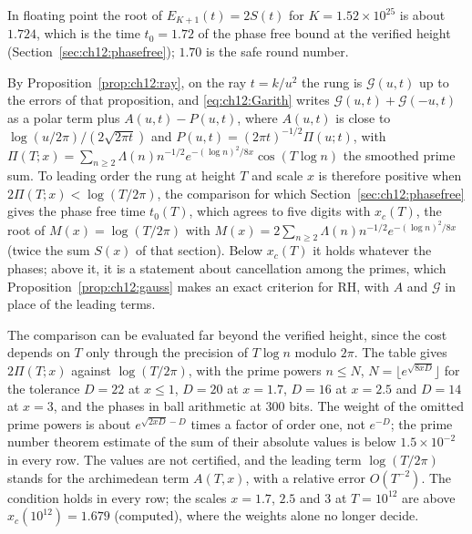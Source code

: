 In floating point the root of $E_{K+1}(t)=2S(t)$ for $K=1.52\times10^{25}$ is about $1.724$, which is the time $t_0=1.72$ of the phase free bound at the verified height (Section~\ref{sec:ch12:phasefree}); $1.70$ is the safe round number.

By Proposition~\ref{prop:ch12:ray}, on the ray $t=k/u^2$ the rung is $\mathcal G(u,t)$ up to the errors of that proposition, and \eqref{eq:ch12:Garith} writes $\mathcal G(u,t)+\mathcal G(-u,t)$ as a polar term plus $A(u,t)-P(u,t)$, where $A(u,t)$ is close to $\log(u/2\pi)/(2\sqrt{2\pi t})$ and $P(u,t)=(2\pi t)^{-1/2}\Pi(u;t)$, with $\Pi(T;x)=\sum_{n\ge2}\Lambda(n)n^{-1/2}e^{-(\log n)^2/8x}\cos(T\log n)$ the smoothed prime sum. To leading order the rung at height $T$ and scale $x$ is therefore positive when $2\Pi(T;x)<\log(T/2\pi)$, the comparison for which Section~\ref{sec:ch12:phasefree} gives the phase free time $t_0(T)$, which agrees to five digits with $x_c(T)$, the root of $M(x)=\log(T/2\pi)$ with $M(x)=2\sum_{n\ge2}\Lambda(n)n^{-1/2}e^{-(\log n)^2/8x}$ (twice the sum $S(x)$ of that section). Below $x_c(T)$ it holds whatever the phases; above it, it is a statement about cancellation among the primes, which Proposition~\ref{prop:ch12:gauss} makes an exact criterion for RH, with $A$ and $\mathcal G$ in place of the leading terms.

The comparison can be evaluated far beyond the verified height, since the cost depends on $T$ only through the precision of $T\log n$ modulo $2\pi$. The table gives $2\Pi(T;x)$ against $\log(T/2\pi)$, with the prime powers $n\le N$, $N=\lfloor e^{\sqrt{8xD}}\rfloor$ for the tolerance $D=22$ at $x\le1$, $D=20$ at $x=1.7$, $D=16$ at $x=2.5$ and $D=14$ at $x=3$, and the phases in ball arithmetic at $300$ bits. The weight of the omitted prime powers is about $e^{\sqrt{2xD}-D}$ times a factor of order one, not $e^{-D}$; the prime number theorem estimate of the sum of their absolute values is below $1.5\times10^{-2}$ in every row. The values are not certified, and the leading term $\log(T/2\pi)$ stands for the archimedean term $A(T,x)$, with a relative error $O(T^{-2})$. The condition holds in every row; the scales $x=1.7$, $2.5$ and $3$ at $T=10^{12}$ are above $x_c(10^{12})=1.679$ (computed), where the weights alone no longer decide.

